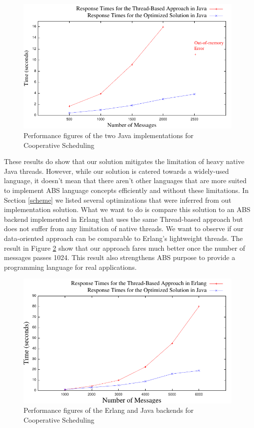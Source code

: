 \begin{figure}
	\label{jj}
	\centering
	\includegraphics[scale=1]{jaj8.pdf}
	\caption{Performance figures of the two Java implementations for Cooperative Scheduling}
\end{figure}

\par These results do show that our solution mitigates the limitation of heavy native Java threads. However, while our solution is catered towards a widely-used language, it doesn't mean that there aren't other languages that are more suited to implement ABS language concepts efficiently and without these limitations. In Section \ref{scheme} we listed several optimizations that were inferred from out implementation solution. What we want to do is compare this solution to an ABS backend implemented in Erlang that uses the same Thread-based approach but does not suffer from any limitation of native threads. We want to observe if our data-oriented approach can be comparable to Erlang's lightweight threads. The result in Figure \ref{ej} show that our approach fares much better once the number of messages passes 1024. This result also strengthens ABS purpose to provide a programming language for real applications.

\begin{figure}
	\label{ej}
	\centering
	\includegraphics[scale=1]{erlj8.pdf}
	\caption{Performance figures of the Erlang and Java backends for Cooperative Scheduling}
\end{figure}



